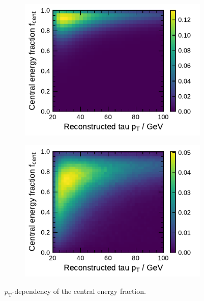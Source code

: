 \begin{figure}[ht]
  \begin{subfigure}[t]{0.48\textwidth}
    \centering
    \includegraphics{./figures/bdt_perf/cent_frac_vs_pt_sig.pdf}
  \end{subfigure}\hfill
  \begin{subfigure}[t]{0.48\textwidth}
    \centering
    \includegraphics{./figures/bdt_perf/cent_frac_vs_pt_bkg.pdf}
  \end{subfigure}
    \caption{$p_\text{T}$-dependency of the central energy fraction.}
  \label{fig:bdt_pt_dependency}
\end{figure}

